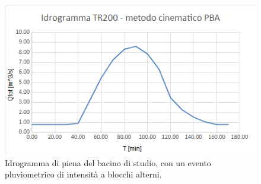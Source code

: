 \begin{figure}[H]  \centering
            \includegraphics[scale=0.8]{immagini/metodo_cinematico_p_b_alterni.png}
            \caption{Idrogramma di piena del bacino di studio, con un evento pluviometrico di intensità a blocchi alterni.}
            \label{metod_cinematico_p_b_alterni}
\end{figure}

